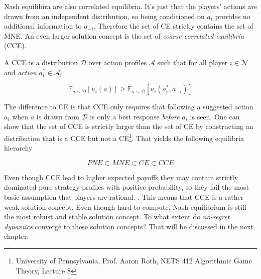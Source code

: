 Nash equilibira are also correlated equilibria. It's just that the players' actions are drawn from an independent distribution, so being conditioned on $a_i$ provides no additional information to $a_{-i}$. Therefore the set of CE strictly contains the set of MNE. An even larger solution concept is the set of \textit{coarse correlated equilibria} (CCE). 

\begin{definition}
    A CCE is a distribution $\mathcal{D}$ over action profiles $\mathcal{A}$ such that for all player $i \in \mathcal{N}$ and \textit{action} $a_{i}^{*} \in \mathcal{A}_i$

    \[\mathbb{E}_{a \sim \mathcal{D}}[u_i(a)] \ge \mathbb{E}_{a \sim \mathcal{D}}[u_i(a_{i}^{*},a_{-i})]\]
\end{definition}

The difference to CE is that CCE only requires that following a suggested action $a_i$ when $a$ is drawn from $\mathcal{D}$ is only a best response \textit{before} $a_i$ is seen. One can show that the set of CCE is strictly larger than the set of CE by constructing an distribution that is a CCE but not a CE\footnote{University of Pennsylvania, Prof. Aaron Roth, NETS 412 Algorithmic Game Theory, Lecture 8}. That yields the following equilibria hierarchy

\begin{equation*}
    PNE \subset MNE \subset CE \subset CCE
\end{equation*}

Even though CCE lead to higher expected payoffs they may contain strictly dominated pure strategy profiles with positive probability, so they fail the most basic assumption that players are rational. \cite{viossat}. This means that CCE is a rather weak solution concept. Even though hard to compute, Nash equilibrium is still the most robust and stable solution concept. To what extent do \textit{no-regret dynamics} converge to these solution concepts?  That will be discussed in the next chapter.


